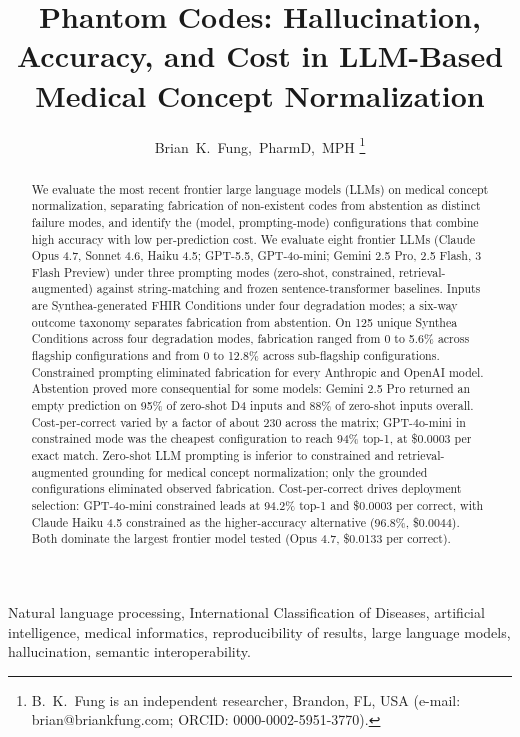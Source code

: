 \documentclass[journal]{IEEEtran}
\title{Phantom Codes: Hallucination, Accuracy, and Cost in
LLM-Based Medical Concept Normalization}
\author{Brian~K.~Fung,~PharmD,~MPH%
\thanks{B.~K.~Fung is an independent researcher,
Brandon, FL, USA (e-mail: brian@briankfung.com;
ORCID: 0000-0002-5951-3770).}}
\begin{document}
\maketitle

\begin{abstract}
We evaluate the most recent frontier large language models (LLMs)
on medical concept normalization, separating fabrication of
non-existent codes from abstention as distinct failure modes, and
identify the (model, prompting-mode) configurations that combine
high accuracy with low per-prediction cost. We evaluate eight
frontier LLMs (Claude Opus 4.7, Sonnet 4.6, Haiku 4.5; GPT-5.5,
GPT-4o-mini; Gemini 2.5 Pro, 2.5 Flash, 3 Flash Preview) under
three prompting modes (zero-shot, constrained, retrieval-augmented)
against string-matching and frozen sentence-transformer baselines.
Inputs are Synthea-generated FHIR Conditions under four degradation
modes; a six-way outcome taxonomy separates fabrication from
abstention. On 125 unique Synthea Conditions across four
degradation modes, fabrication ranged from 0 to 5.6\% across
flagship configurations and from 0 to 12.8\% across sub-flagship
configurations. Constrained prompting eliminated fabrication for
every Anthropic and OpenAI model. Abstention proved more
consequential for some models: Gemini 2.5 Pro returned an empty
prediction on 95\% of zero-shot D4 inputs and 88\% of zero-shot
inputs overall. Cost-per-correct varied by a factor of about 230
across the matrix; GPT-4o-mini in constrained mode was the
cheapest configuration to reach 94\% top-1, at \$0.0003 per exact
match.
Zero-shot LLM prompting is inferior to constrained and
retrieval-augmented grounding for medical concept normalization;
only the grounded configurations eliminated observed fabrication.
Cost-per-correct drives deployment selection: GPT-4o-mini
constrained leads at 94.2\% top-1 and \$0.0003 per correct, with
Claude Haiku 4.5 constrained as the higher-accuracy alternative
(96.8\%, \$0.0044). Both dominate the largest frontier model tested
(Opus 4.7, \$0.0133 per correct).
\end{abstract}

\begin{IEEEkeywords}
Natural language processing, International Classification of
Diseases, artificial intelligence, medical informatics,
reproducibility of results, large language models, hallucination,
semantic interoperability.
\end{IEEEkeywords}
\end{document}
